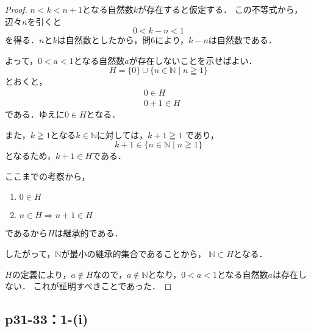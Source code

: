 \documentclass[a4paper,10pt,fleqn]{ltjsarticle}
\begin{document}
\begin{tleftbar}
	\begin{proof}
		$n < k < n+1$となる自然数$k$が存在すると仮定する．
        この不等式から，辺々$n$を引くと
		\[
        0 < k - n < 1 
        \]
		を得る．$n$と$k$は自然数としたから，問6により，$k-n$は自然数である．
        
        よって，$0<a<1$となる自然数$a$が存在しないことを示せばよい．
		\[
            H=\{0\} \cup \{n \in \mathbb{N} \mid n \geqq 1 \}
        \]
		とおくと，
		\begin{align*}
			&0 \in H \\
			&0+1 \in H
		\end{align*}
		である．ゆえに$ 0 \in H$となる．

		また，$k \geqq 1$となる$k \in \mathbb{N}$に対しては，$k +1 \geqq 1$
        であり，
        \[
        k+1 \in \{n \in \mathbb{N} \mid n \geqq 1 \} 
        \]
        となるため，$k+1 \in H$である．
        
        ここまでの考察から，
        \begin{enumerate}
            \item $0 \in H$
            \item $n \in H \Longrightarrow n+1 \in H$
        \end{enumerate}
         であるから$H$は継承的である．
         
         したがって，$\mathbb{N}$が最小の継承的集合であることから，
         $\mathbb{N} \subset H$となる．
        
		$H$の定義により，$a \notin H$なので，$a \notin \mathbb{N}$となり，$0<a<1$となる自然数$a$は存在しない．
        これが証明すべきことであった．
	\end{proof}
\end{tleftbar}

\newpage 

\subsection*{p31-33：1-(i)}
\end{document}
